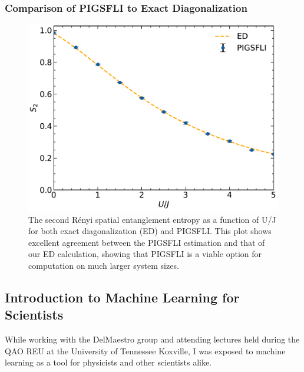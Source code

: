 \subsubsection{Comparison of PIGSFLI to Exact Diagonalization} \label{results}
\begin{figure}[H]
\centering
\includegraphics[scale=0.5]{../figures/renyi_spatial.pdf}
\caption{The second Rényi spatial entanglement entropy as a function of U/J for both exact diagonalization (ED) and PIGSFLI. This plot shows excellent agreement between the PIGSFLI estimation and that of our ED calculation, showing that PIGSFLI is a viable option for computation on much larger system sizes.}
\label{fig:renyi_spatial}
\end{figure}

\subsection{Introduction to Machine Learning for Scientists}
While working with the DelMaestro group and attending lectures held during the QAO REU at the University of Tennessee Koxville, I was exposed to machine learning as a tool for physicists and other scientists alike. 

